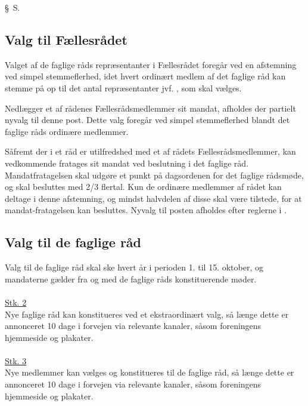 \begin{list}
{\S\ S.}{}
    \setlength{\labelwidth}{.5in}%
    \setlength{\leftmargin}{.25in} %

\subsection{Valg til Fællesrådet}
\label{kap:valgtilfaellesraad}

\item \label{S:FR:valgtilFR} Valget af de faglige råds repræsentanter i Fællesrådet foregår ved en afstemning ved simpel stemmeflerhed, idet hvert ordinært medlem af det faglige råd kan stemme på op til det antal repræsentanter jvf. , som skal vælges.

\item \label{S:FR:nyvalgFR} Nedlægger et af rådenes Fællesrådsmedlemmer sit mandat, afholdes der partielt nyvalg til denne post. Dette valg foregår ved simpel stemmeflerhed blandt det faglige råds ordinære medlemmer.

\item \label{S:FR:omvalgFR} Såfremt der i et råd er utilfredshed med et af rådets Fællesrådsmedlemmer, kan vedkommende fratages sit mandat ved beslutning i det faglige råd. Mandatfratagelsen skal udgøre et punkt på dagsordenen for det faglige rådsmøde, og skal besluttes med 2/3 flertal. Kun de ordinære medlemmer af rådet kan deltage i denne afstemning, og mindst halvdelen af disse skal være tilstede, for at mandat-fratagelsen kan besluttes. Nyvalg til posten afholdes efter reglerne i  .



\subsection{Valg til de faglige råd}
\label{S:kap:valgtilfagligraad}
\item \label{S:Faglig:ValgtilFaglig} Valg til de faglige råd skal ske hvert år i perioden 1. til 15. oktober, og mandaterne gælder fra og med de faglige råds konstituerende møder.\\
\\
\underline{Stk. 2} \\
Nye faglige råd kan konstitueres ved et ekstraordinært valg, så længe dette er annonceret 10 dage i forvejen via relevante kanaler, såsom foreningens hjemmeside og plakater.\\
\\
\underline{Stk. 3} 
\\
Nye medlemmer kan vælges og konstitueres til de faglige råd, så længe dette er annonceret 10 dage i forvejen via relevante kanaler, såsom foreningens hjemmeside og plakater.\\


\end{list}
